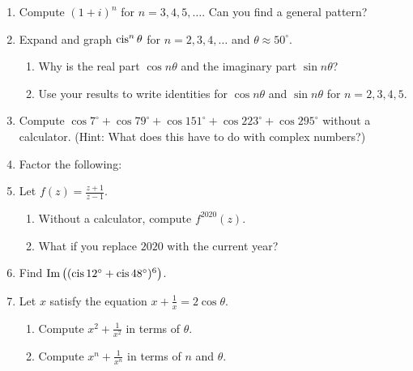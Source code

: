 \documentclass[../textbook.tex]{subfiles}
\begin{document}
\begin{enumerate}
\item Compute $(1+i)^n$ for $n=3,4,5,\ldots$. Can you find a general pattern? %
\item Expand and graph $\operatorname{cis}^n \theta$ for $n=2,3,4,\ldots$ and $\theta\approx 50^\circ$. %

\begin{enumerate}
\item Why is the real part $\cos n\theta$ and the imaginary part $\sin n\theta$? %
\item Use your results to write identities for $\cos n\theta$ and $\sin n\theta$ for $n=2,3,4,5$. %
\end{enumerate}

\newcommand{\cosdeg}[1] {\cos #1^\circ}

\item Compute $\cosdeg{7} + \cosdeg{79} + \cosdeg{151} + \cosdeg{223} + \cosdeg{295}$ without a calculator. (Hint: What does this have to do with complex numbers?) %
\item Factor the following: %
\begin{enumerate}
\end{enumerate}

\item Let $f(z)=\frac{z+1}{z-1}$. %
\begin{enumerate}
\item Without a calculator, compute $f^{2020}(z)$. %
\item What if you replace $2020$ with the current year? %
\end{enumerate}

\item Find $\operatorname{Im}\left((\operatorname{cis} 12^\circ + \operatorname{cis} 48^\circ)^6\right)$. %

\item Let $x$ satisfy the equation $x+\frac{1}{x}=2\cos\theta$. %
\begin{enumerate}
\item Compute $x^2+\frac{1}{x^2}$ in terms of $\theta$. %
\item Compute $x^n+\frac{1}{x^n}$ in terms of $n$ and $\theta$. %
\end{enumerate}
\end{enumerate}
\end{document}

